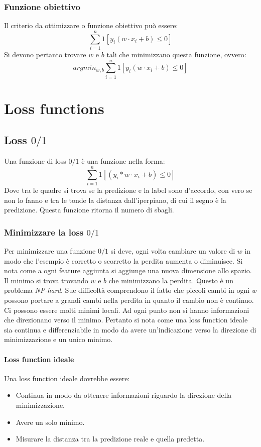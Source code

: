 		\subsubsection{Funzione obiettivo}
		Il criterio da ottimizzare o funzione obiettivo pu\`o essere:
		$$\sum\limits_{i=1}^n1[y_i(w\cdot x_i+b)\le 0]$$
		Si devono pertanto trovare $w$ e $b$ tali che minimizzano questa funzione, ovvero:
		$$argmin_{w,b}\sum\limits_{i=1}^n1[y_i(w\cdot x_i+b)\le 0]$$

\section{Loss functions}

	\subsection{Loss $0/1$}
	Una funzione di loss $0/1$ \`e una funzione nella forma:
	$$\sum\limits_{i=1}^n1[(y_i*w\cdot x_i+b)\le 0]$$
	Dove tra le quadre si trova se la predizione e la label sono d'accordo, con vero se non lo fanno e tra le tonde la distanza dall'iperpiano, di cui il segno \`e la predizione.
	Questa funzione ritorna il numero di sbagli.

		\subsubsection{Minimizzare la loss $0/1$}
		Per minimizzare una funzione $0/1$ si deve, ogni volta cambiare un valore di $w$ in modo che l'esempio \`e corretto o scorretto la perdita aumenta o diminuisce.
		Si nota come a ogni feature aggiunta si aggiunge una nuova dimensione allo spazio.
		Il minimo si trova trovando $w$ e $b$ che minimizzano la perdita.
		Questo \`e un problema \emph{NP-hard}.
		Sue difficolt\`a comprendono il fatto che piccoli cambi in ogni $w$ possono portare a grandi cambi nella perdita in quanto il cambio non \`e continuo.
		Ci possono essere molti minimi locali.
		Ad ogni punto non si hanno informazioni che direzionano verso il minimo.
		Pertanto si nota come una loss function ideale sia continua e differenziabile in modo da avere un'indicazione verso la direzione di minimizzazione e un unico minimo.

			\paragraph{Loss function ideale}
			Una loss function ideale dovrebbe essere:
			\begin{itemize}
				\item Continua in modo da ottenere informazioni riguardo la direzione della minimizzazione.
				\item Avere un solo minimo.
				\item Misurare la distanza tra la predizione reale e quella predetta.
			\end{itemize}

